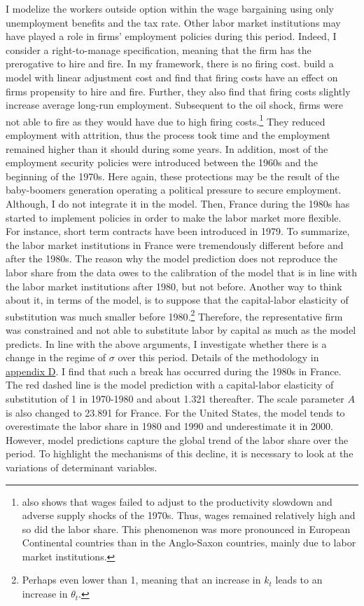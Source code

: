 I modelize the workers outside option within the wage bargaining using only unemployment benefits and the tax rate. Other labor market institutions may have played a role in firms' employment policies during this period. Indeed, I consider a right-to-manage specification, meaning that the firm has the prerogative to hire and fire. In my framework, there is no firing cost. \cite{Bentolila1990} build a model with linear adjustment cost and find that firing costs have an effect on firms propensity to hire and fire. Further, they also find that firing costs slightly increase average long-run employment. Subsequent to the oil shock, firms were not able to fire as they would have due to high firing costs.\footnote{\cite{Blanchard1997} also shows that wages failed to adjust to the productivity slowdown and adverse supply shocks of the 1970s. Thus, wages remained relatively high and so did the labor share. This phenomenon was more pronounced in European Continental countries than in the Anglo-Saxon countries, mainly due to labor market institutions.} They reduced employment with attrition, thus the process took time and the employment remained higher than it should during some years. In addition, most of the employment security policies were introduced between the 1960s and the beginning of the 1970s. Here again, these protections may be the result of the baby-boomers generation operating a political pressure to secure employment. Although, I do not integrate it in the model. Then, France during the 1980s has started to implement policies in order to make the labor market more flexible. For instance, short term contracts have been introduced in 1979. To summarize, the labor market institutions in France were tremendously different before and after the 1980s. The reason why the model prediction does not reproduce the labor share from the data owes to the calibration of the model that is in line with the labor market institutions after 1980, but not before. Another way to think about it, in terms of the model, is to suppose that the capital-labor elasticity of substitution was much smaller before 1980.\footnote{Perhaps even lower than 1, meaning that an increase in $k_t$ leads to an increase in $\theta_t$.} Therefore, the representative firm was constrained and not able to substitute labor by capital as much as the model predicts.
In line with the above arguments, I investigate whether there is a change in the regime of $\sigma$ over this period. Details of the methodology in \hyperref[appendix:regime]{appendix D}. I find that such a break has occurred during the 1980s in France. The red dashed line is the model prediction with a capital-labor elasticity of substitution of 1 in 1970-1980 and about 1.321 thereafter. The scale parameter $A$ is also changed to 23.891 for France.
For the United States, the model tends to overestimate the labor share in 1980 and 1990 and underestimate it in 2000.
However, model predictions capture the global trend of the labor share over the period.
To highlight the mechanisms of this decline, it is necessary to look at the variations of determinant variables.

